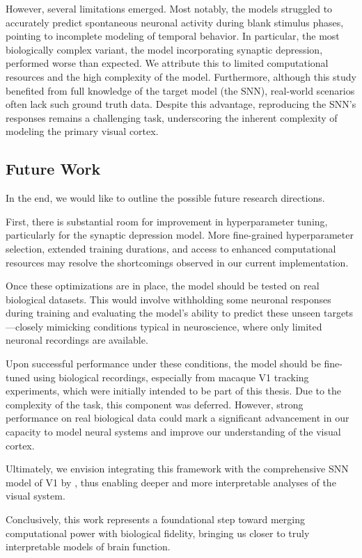 However, several limitations emerged. Most notably, the models struggled to accurately predict spontaneous neuronal activity during blank stimulus phases, pointing to incomplete modeling of temporal behavior. In particular, the most biologically complex variant, the model incorporating synaptic depression, performed worse than expected. We attribute this to limited computational resources and the high complexity of the model. Furthermore, although this study benefited from full knowledge of the target model (the SNN), real-world scenarios often lack such ground truth data. Despite this advantage, reproducing the SNN's responses remains a challenging task, underscoring the inherent complexity of modeling the primary visual cortex.

\subsection*{Future Work}
In the end, we would like to outline the possible future research directions. 

First, there is substantial room for improvement in hyperparameter tuning, particularly for the synaptic depression model. More fine-grained hyperparameter selection, extended training durations, and access to enhanced computational resources may resolve the shortcomings observed in our current implementation.

Once these optimizations are in place, the model should be tested on real biological datasets. This would involve withholding some neuronal responses during training and evaluating the model's ability to predict these unseen targets—closely mimicking conditions typical in neuroscience, where only limited neuronal recordings are available.

Upon successful performance under these conditions, the model should be fine-tuned using biological recordings, especially from macaque V1 tracking experiments, which were initially intended to be part of this thesis. Due to the complexity of the task, this component was deferred. However, strong performance on real biological data could mark a significant advancement in our capacity to model neural systems and improve our understanding of the visual cortex.

Ultimately, we envision integrating this framework with the comprehensive SNN model of V1 by \citet{antolik2024comprehensive}, thus enabling deeper and more interpretable analyses of the visual system.

Conclusively, this work represents a foundational step toward merging computational power with biological fidelity, bringing us closer to truly interpretable models of brain function.
